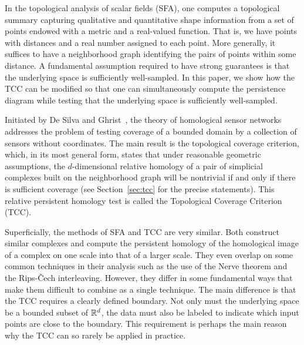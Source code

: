 
In the topological analysis of scalar fields (SFA), one computes a topological summary capturing qualitative and quantitative shape information from a set of points endowed with a metric and a real-valued function.
That is, we have points with distances and a real number assigned to each point.
More generally, it suffices to have a neighborhood graph identifying the pairs of points within some distance.
A fundamental assumption required to have strong guarantees is that the underlying space is sufficiently well-sampled.
In this paper, we show how the TCC can be modified so that one can simultaneously compute the persistence diagram while testing that the underlying space is sufficiently well-sampled.

Initiated by De Silva and Ghrist~\cite{desilva06coordinate,desilva07coverage,desilva07homological}, the theory of homological sensor networks addresses the problem of testing coverage of a bounded domain by a collection of sensors without coordinates.
The main result is the topological coverage criterion, which, in its most general form, states that under reasonable geometric assumptions, the $d$-dimensional relative homology of a pair of simplicial complexes built on the neighborhood graph will be nontrivial if and only if there is sufficient coverage (see Section~\ref{sec:tcc} for the precise statements).
This relative persistent homology test is called the Topological Coverage Criterion (TCC).

Superficially, the methods of SFA and TCC are very similar.
Both construct similar complexes and compute the persistent homology of the homological image of a complex on one scale into that of a larger scale.
They even overlap on some common techniques in their analysis such as the use of the Nerve theorem and the Rips-\v{C}ech interleaving.
However, they differ in some fundamental ways that make them difficult to combine as a single technique.
The main difference is that the TCC requires a clearly defined boundary.
Not only must the underlying space be a bounded subset of $\mathbb{R}^d$, the data must also be labeled to indicate which input points are close to the boundary.
This requirement is perhaps the main reason why the TCC can so rarely be applied in practice.

